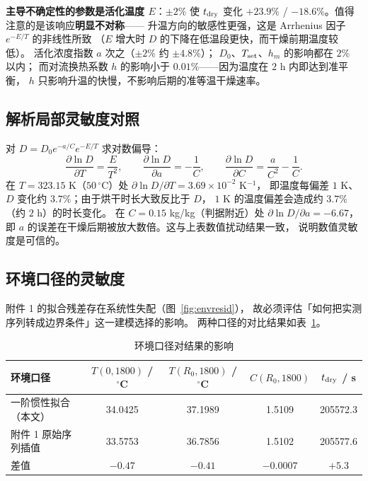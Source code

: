 \documentclass[bwprint]{cumcmthesis}
\begin{document}
\textbf{主导不确定性的参数是活化温度 $E$}：$\pm2\%$ 使 $t_{\rm dry}$ 变化
$+23.9\%$ / $-18.6\%$。值得注意的是该响应\textbf{明显不对称}——
升温方向的敏感性更强，这是 Arrhenius 因子 $e^{-E/T}$ 的非线性所致
（$E$ 增大时 $D$ 的下降在低温段更快，而干燥前期温度较低）。
活化浓度指数 $a$ 次之（$\pm2\%$ 约 $\pm4.8\%$）；
$D_0$、$T_{\rm set}$、$h_m$ 的影响都在 $2\%$ 以内；
而对流换热系数 $h$ 的影响小于 $0.01\%$——因为温度在 $2$ h 内即达到准平衡，
$h$ 只影响升温的快慢，不影响后期的准等温干燥速率。

\subsection{解析局部灵敏度对照}

对 $D=D_0e^{-a/C}e^{-E/T}$ 求对数偏导：
\begin{equation}
\frac{\partial\ln D}{\partial T}=\frac{E}{T^2},\qquad
\frac{\partial\ln D}{\partial a}=-\frac{1}{C},\qquad
\frac{\partial\ln D}{\partial C}=\frac{a}{C^2}-\frac{1}{C}.
\end{equation}
在 $T=323.15$ K（$50\,^\circ$C）处 $\partial\ln D/\partial T=3.69\times10^{-2}$ K$^{-1}$，
即温度每偏差 $1$ K、$D$ 变化约 $3.7\%$；由于烘干时长大致反比于 $D$，
$1$ K 的温度偏差会造成约 $3.7\%$（约 $2$ h）的时长变化。
在 $C=0.15$ kg/kg（判据附近）处 $\partial\ln D/\partial a=-6.67$，
即 $a$ 的误差在干燥后期被放大数倍。这与上表数值扰动结果一致，
说明数值灵敏度是可信的。

\subsection{环境口径的灵敏度}

附件 1 的拟合残差存在系统性失配（图~\ref{fig:envresid}），
故必须评估「如何把实测序列转成边界条件」这一建模选择的影响。
两种口径的对比结果如表~\ref{tab:ambient}。

\begin{table}[H]
\centering
\small
\caption{环境口径对结果的影响}
\label{tab:ambient}
\begin{tabular}{@{}lcccc@{}}
\toprule
环境口径 & $T(0,1800)$ / $^\circ$C & $T(R_0,1800)$ / $^\circ$C & $C(R_0,1800)$ & $t_{\rm dry}$ / s \\
\midrule
一阶惯性拟合（本文） & 34.0425 & 37.1989 & 1.5109 & 205572.3 \\
附件 1 原始序列插值 & 33.5753 & 36.7856 & 1.5102 & 205577.6 \\
\midrule
差值 & $-0.47$ & $-0.41$ & $-0.0007$ & $+5.3$ \\
\bottomrule
\end{tabular}
\end{table}
\end{document}
